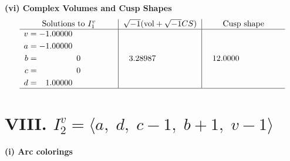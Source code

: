 \documentclass[1p]{elsarticle_modified}
\theoremstyle{definition}
\newcommand{\I}{\sqrt{-1}}
\begin{document}
\newpage\flushleft \textbf{(vi) Complex Volumes and Cusp Shapes}
$$\begin{array}{c|c|c}  
\text{Solutions to }I^v_{1}& \I (\text{vol} + \sqrt{-1}CS) & \text{Cusp shape}\\
 \hline 
\begin{aligned}
v &= -1.00000\phantom{ +0.000000I} \\
a &= -1.00000\phantom{ +0.000000I} \\
b &= \phantom{-0.000000 } 0 \\
c &= \phantom{-0.000000 } 0 \\
d &= \phantom{-}1.00000\phantom{ +0.000000I}\end{aligned}
 & \phantom{-}3.28987\phantom{ +0.000000I} & \phantom{-}12.0000\phantom{ +0.000000I}\\
 \hline 
 \end{array}$$\newpage\newpage\renewcommand{\arraystretch}{1}
\centering \section*{VIII. $I^v_{2}= \langle a,\;d,\;c-1,\;b+1,\;v-1 \rangle$}
\flushleft \textbf{(i) Arc colorings}\\
\end{document}
